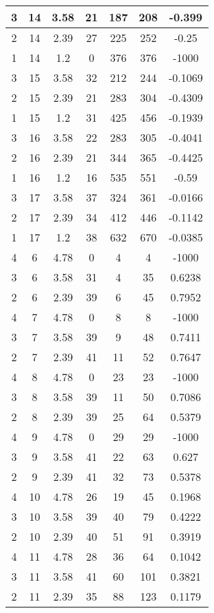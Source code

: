 \documentclass[letterpaper, 12pt]{article}
\begin{document}
\begin{longtable}{|c|c|c|c|c|c|c|}
\hline
3 & 14 & 3.58 & 21 & 187 & 208 & -0.399 \\
\hline
2 & 14 & 2.39 & 27 & 225 & 252 & -0.25 \\
\hline
1 & 14 & 1.2 & 0 & 376 & 376 & -1000 \\
\hline
3 & 15 & 3.58 & 32 & 212 & 244 & -0.1069 \\
\hline
2 & 15 & 2.39 & 21 & 283 & 304 & -0.4309 \\
\hline
1 & 15 & 1.2 & 31 & 425 & 456 & -0.1939 \\
\hline
3 & 16 & 3.58 & 22 & 283 & 305 & -0.4041 \\
\hline
2 & 16 & 2.39 & 21 & 344 & 365 & -0.4425 \\
\hline
1 & 16 & 1.2 & 16 & 535 & 551 & -0.59 \\
\hline
3 & 17 & 3.58 & 37 & 324 & 361 & -0.0166 \\
\hline
2 & 17 & 2.39 & 34 & 412 & 446 & -0.1142 \\
\hline
1 & 17 & 1.2 & 38 & 632 & 670 & -0.0385 \\
\hline
4 & 6 & 4.78 & 0 & 4 & 4 & -1000 \\
\hline
3 & 6 & 3.58 & 31 & 4 & 35 & 0.6238 \\
\hline
2 & 6 & 2.39 & 39 & 6 & 45 & 0.7952 \\
\hline
4 & 7 & 4.78 & 0 & 8 & 8 & -1000 \\
\hline
3 & 7 & 3.58 & 39 & 9 & 48 & 0.7411 \\
\hline
2 & 7 & 2.39 & 41 & 11 & 52 & 0.7647 \\
\hline
4 & 8 & 4.78 & 0 & 23 & 23 & -1000 \\
\hline
3 & 8 & 3.58 & 39 & 11 & 50 & 0.7086 \\
\hline
2 & 8 & 2.39 & 39 & 25 & 64 & 0.5379 \\
\hline
4 & 9 & 4.78 & 0 & 29 & 29 & -1000 \\
\hline
3 & 9 & 3.58 & 41 & 22 & 63 & 0.627 \\
\hline
2 & 9 & 2.39 & 41 & 32 & 73 & 0.5378 \\
\hline
4 & 10 & 4.78 & 26 & 19 & 45 & 0.1968 \\
\hline
3 & 10 & 3.58 & 39 & 40 & 79 & 0.4222 \\
\hline
2 & 10 & 2.39 & 40 & 51 & 91 & 0.3919 \\
\hline
4 & 11 & 4.78 & 28 & 36 & 64 & 0.1042 \\
\hline
3 & 11 & 3.58 & 41 & 60 & 101 & 0.3821 \\
\hline
2 & 11 & 2.39 & 35 & 88 & 123 & 0.1179 \\

\end{longtable}
\end{document}
